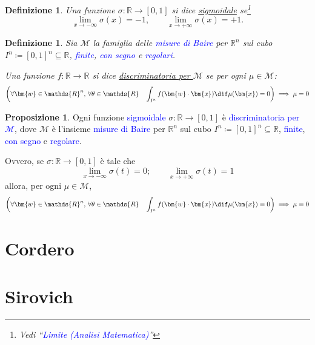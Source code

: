 \documentclass[10pt]{book}
\newcommand{\1}{\mathds{1}}
\newcommand{\R}{\mathds{R}}
\theoremstyle{definition}%
\newtheorem{prop}[thm]{Proposizione}
\theoremstyle{plain}
\newtheorem{definizione}[thm]{Definizione}
\theoremstyle{remark}
\renewcommand{\href}[2]{\textcolor{blue}{#2}}
\begin{document}
\begin{definizione}
Una funzione \(\sigma:\R\to [0,1]\) si dice \uline{sigmoidale} se\footnote{Vedi ``\href{../../../../../org/roam/20250625110412-limite_analisi_matematica.org}{Limite (Analisi Matematica)}''}
\begin{equation*}
\lim_{x\to-\infty} \sigma(x) = -1,\qquad \lim_{x\to +\infty} \sigma(x)= +1.
\end{equation*}
\end{definizione}
\begin{definizione}
Sia \(\mathcal{M}\) la famiglia delle \href{../../../../../org/roam/20250625104200-misura_di_baire.org}{misure di Baire} per \(\R^{n}\) sul cubo \(I^{n} \coloneqq [0,1]^{n} \subseteq \R\), \href{../../../../../org/roam/20250625110016-misura_finita.org}{finite}, \href{../../../../../org/roam/20250625110024-misura_con_segno.org}{con segno} e \href{../../../../../org/roam/20250625110032-misura_regolare.org}{regolari}.

Una funzione \(f: \R\to \R\) si dice \uline{discriminatoria per \(\mathcal{M}\)} se per ogni \(\mu \in \mathcal{M}\):
\begin{equation*}
\left(\forall \bm{w} \in \R^{n},\, \forall \theta \in \R\quad \int_{I^{n}} f(\bm{w}\cdot\bm{x}) \dif \mu(\bm{x}) = 0\right)\implies \mu=0
\end{equation*}
\end{definizione}
\begin{prop}
Ogni funzione \href{../../../../../org/roam/20250625110110-funzione_sigmoidale.org}{sigmoidale} \(\sigma:\R\to [0,1]\) è \href{../../../../../org/roam/20250625105528-funzione_discriminatoria_per_una_misura_di_baire_sul_cubo_unitario.org}{discriminatoria per \(\mathcal{M}\)}, dove \(\mathcal{M}\) è l'insieme \href{../../../../../org/roam/20250625104200-misura_di_baire.org}{misure di Baire} per \(\R^{n}\) sul cubo \(I^{n} \coloneqq [0,1]^{n} \subseteq \R\), \href{../../../../../org/roam/20250625110016-misura_finita.org}{finite}, \href{../../../../../org/roam/20250625110024-misura_con_segno.org}{con segno} e \href{../../../../../org/roam/20250625110032-misura_regolare.org}{regolare}.

Ovvero, se \(\sigma:\R\to [0,1]\) è tale che
\begin{equation*}
\lim_{x\to-\infty}\sigma(t) =0;\qquad \lim_{x\to+\infty}\sigma(t)=1
\end{equation*}
allora, per ogni \(\mu \in \mathcal{M}\),
\begin{equation*}
\left(\forall \bm{w} \in \R^{n},\, \forall \theta \in \R\quad \int_{I^{n}} f(\bm{w}\cdot\bm{x}) \dif \mu(\bm{x}) = 0\right)\implies \mu=0
\end{equation*}
\end{prop}

\part{Cordero}

\part{Sirovich}
\end{document}
